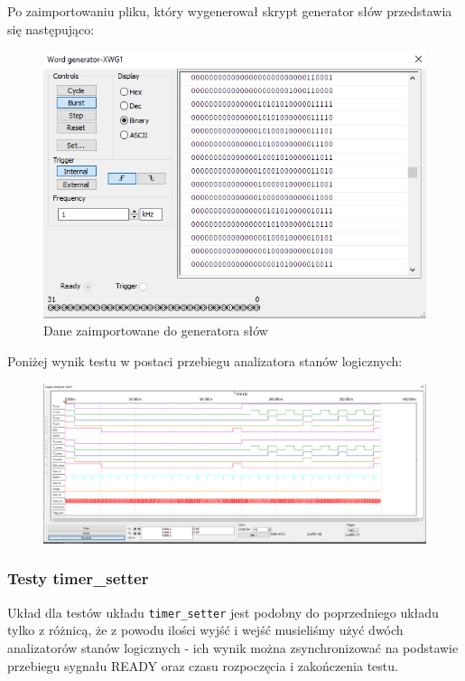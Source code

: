 \documentclass[a4paper]{article}
\begin{document}
Po zaimportowaniu pliku, który wygenerował skrypt generator słów przedstawia się następująco:
\begin{figure}[H]
    \centering

    \includegraphics{driver_test_word_generator.png}
    \caption{Dane zaimportowane do generatora słów}
\end{figure}
\pagebreak
Poniżej wynik testu w postaci przebiegu analizatora stanów logicznych:
\begin{figure}[H]
    \centering
    \includegraphics[width=\textwidth]{component_test_logic_analyzer_xla1_driver.png}
\end{figure}
\pagebreak
\subsubsection{Testy timer\_setter}
Układ dla testów układu \verb|timer_setter| jest podobny do poprzedniego układu tylko z różnicą, że
z powodu ilości wyjść i wejść musieliśmy użyć dwóch analizatorów stanów logicznych - ich wynik 
można zsynchronizować na podstawie przebiegu sygnału READY oraz czasu rozpoczęcia i zakończenia testu.
\end{document}
